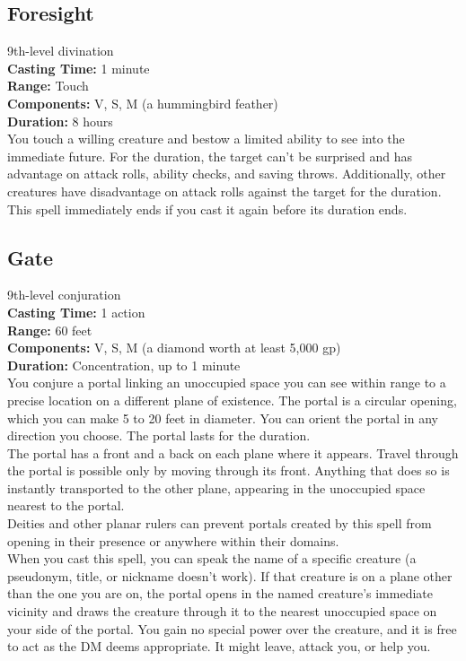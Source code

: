 \documentclass[11pt, A4paper, english]{article}
\begin{document}
		\subsection{Foresight}
9th-level divination \\
\textbf{Casting Time:} 1 minute \\
\textbf{Range:} Touch \\
\textbf{Components:} V, S, M (a hummingbird feather) \\
\textbf{Duration:} 8 hours \\
You touch a willing creature and bestow a limited ability to see into the immediate future. For the duration, the target can’t be surprised and has advantage on attack rolls, ability checks, and saving throws. Additionally, other creatures have disadvantage on attack rolls against the target for the duration. \\
This spell immediately ends if you cast it again before its duration ends.

		\subsection{Gate}
9th-level conjuration \\
\textbf{Casting Time:} 1 action \\
\textbf{Range:} 60 feet \\
\textbf{Components:} V, S, M (a diamond worth at least 5,000 gp) \\
\textbf{Duration:} Concentration, up to 1 minute \\
You conjure a portal linking an unoccupied space you can see within range to a precise location on a different plane of existence. The portal is a circular opening, which you can make 5 to 20 feet in diameter. You can orient the portal in any direction you choose. The portal lasts for the duration. \\
The portal has a front and a back on each plane where it appears. Travel through the portal is possible only by moving through its front. Anything that does so is instantly transported to the other plane, appearing in the unoccupied space nearest to the portal. \\
Deities and other planar rulers can prevent portals created by this spell from opening in their presence or anywhere within their domains. \\
When you cast this spell, you can speak the name of a specific creature (a pseudonym, title, or nickname doesn’t work). If that creature is on a plane other than the one you are on, the portal opens in the named creature’s immediate vicinity and draws the creature through it to the nearest unoccupied space on your side of the portal. You gain no special power over the creature, and it is free to act as the DM deems appropriate. It might leave, attack you, or help you.
\end{document}
